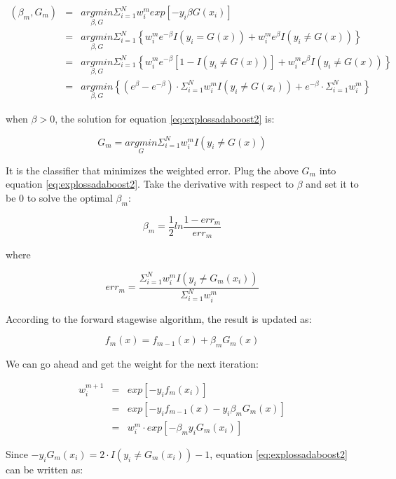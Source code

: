 \documentclass[12pt,]{krantz}
\begin{document}
\begin{equation}
\begin{array}{ccc}
(\beta_{m},G_{m}) & = & \underset{\beta,G}{argmin}\Sigma_{i=1}^{N}w_{i}^{m}exp[-y_{i}\beta G(x_{i})]\\
& = & \underset{\beta,G}{argmin}\Sigma_{i=1}^{N}\left\{ w_{i}^{m}e^{-\beta}I(y_{i}=G(x))+w_{i}^{m}e^{\beta}I(y_{i}\neq G(x))\right\} \\
& = & \underset{\beta,G}{argmin}\Sigma_{i=1}^{N}\left\{ w_{i}^{m}e^{-\beta}[1-I(y_{i}\neq G(x))]+w_{i}^{m}e^{\beta}I(y_{i}\neq G(x))\right\} \\
& = & \underset{\beta,G}{argmin}\left\{ (e^{\beta}-e^{-\beta})\cdot\Sigma_{i=1}^{N}w_{i}^{m}I(y_{i}\neq G(x_{i}))+e^{-\beta}\cdot\Sigma_{i=1}^{N}w_{i}^{m}\right\}
\end{array}
\label{eq:explossadaboost2}
\end{equation}

when \(\beta >0\), the solution for equation \eqref{eq:explossadaboost2} is:

\[G_{m} = \underset{G}{argmin}\Sigma_{i=1}^{N}w_{i}^{m}I(y_{i}\neq G(x))\]

It is the classifier that minimizes the weighted error. Plug the above \(G_m\) into equation \eqref{eq:explossadaboost2}. Take the derivative with respect to \(\beta\) and set it to be 0 to solve the optimal \(\beta_m\):

\[\beta_m =\frac{1}{2}ln\frac{1-err_m}{err_m}\]

where

\[err_m = \frac{\Sigma_{i=1}^N w_i^{m}I(y_i \neq G_m(x_i))}{\Sigma_{i=1}^N w_i^{m}}\]

According to the forward stagewise algorithm, the result is updated as:

\[f_m(x)=f_{m-1}(x)+\beta_m G_m(x)\]

We can go ahead and get the weight for the next iteration:

\begin{equation}
\begin{array}{ccc}
w_i^{m+1} & = & exp[-y_if_m (x_i)]\\
& = & exp[-y_if_{m-1}(x)-y_i \beta_m G_m(x)]\\
& = & w_{i}^{m}\cdot exp[-\beta_m y_i G_m(x_i)]
\end{array}
\label{eq:explossadaboost3}
\end{equation}

Since \(-y_i G_m(x_i)=2\cdot I(y_i \neq G_m(x_i))-1\), equation \eqref{eq:explossadaboost2} can be written as:
\end{document}
